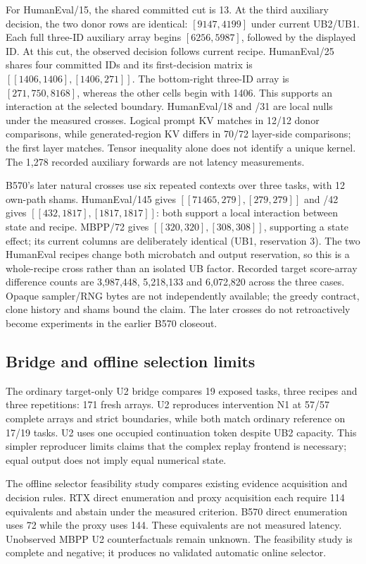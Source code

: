 For HumanEval/15, the shared committed cut is 13. At the third auxiliary decision, the two donor rows are identical: $[9147,4199]$ under current UB2/UB1. Each full three-ID auxiliary array begins $[6256,5987]$, followed by the displayed ID. At this cut, the observed decision follows current recipe. HumanEval/25 shares four committed IDs and its first-decision matrix is $[[1406,1406],[1406,271]]$. The bottom-right three-ID array is $[271,750,8168]$, whereas the other cells begin with 1406. This supports an interaction at the selected boundary. HumanEval/18 and /31 are local nulls under the measured crosses. Logical prompt KV matches in 12/12 donor comparisons, while generated-region KV differs in 70/72 layer-side comparisons; the first layer matches. Tensor inequality alone does not identify a unique kernel. The 1,278 recorded auxiliary forwards are not latency measurements.

B570's later natural crosses use six repeated contexts over three tasks, with 12 own-path shams. HumanEval/145 gives $[[71465,279],[279,279]]$ and /42 gives $[[432,1817],[1817,1817]]$: both support a local interaction between state and recipe. MBPP/72 gives $[[320,320],[308,308]]$, supporting a state effect; its current columns are deliberately identical (UB1, reservation 3). The two HumanEval recipes change both microbatch and output reservation, so this is a whole-recipe cross rather than an isolated UB factor. Recorded target score-array difference counts are 3,987,448, 5,218,133 and 6,072,820 across the three cases. Opaque sampler/RNG bytes are not independently available; the greedy contract, clone history and shams bound the claim. The later crosses do not retroactively become experiments in the earlier B570 closeout.

\subsection{Bridge and offline selection limits}
\label{supp:bridge_selector}
The ordinary target-only U2 bridge compares 19 exposed tasks, three recipes and three repetitions: 171 fresh arrays. U2 reproduces intervention N1 at 57/57 complete arrays and strict boundaries, while both match ordinary reference on 17/19 tasks. U2 uses one occupied continuation token despite UB2 capacity. This simpler reproducer limits claims that the complex replay frontend is necessary; equal output does not imply equal numerical state.

The offline selector feasibility study compares existing evidence acquisition and decision rules. RTX direct enumeration and proxy acquisition each require 114 equivalents and abstain under the measured criterion. B570 direct enumeration uses 72 while the proxy uses 144. These equivalents are not measured latency. Unobserved MBPP U2 counterfactuals remain unknown. The feasibility study is complete and negative; it produces no validated automatic online selector.
